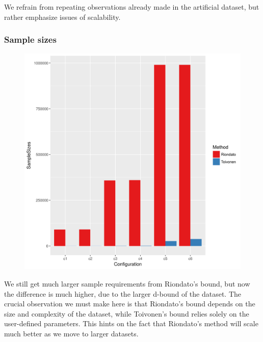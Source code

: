 \documentclass[11pt]{sigplanconf}
\begin{document}
We refrain from repeating observations already made in the artificial dataset, but rather emphasize issues of scalability.

\subsubsection{Sample sizes}
\begin{figure}[h!]
\centering
\includegraphics[width=.7\columnwidth]{kosarak.dat/sampleSizes.png}
\end{figure}
We still get much larger sample requirements from Riondato's bound, but now the difference is much higher, due to the larger d-bound of the dataset. The crucial observation we must make here is that Riondato's bound depends on the size and complexity of the dataset, while Toivonen's bound relies solely on the user-defined parameters. This hints on the fact that Riondato's method will scale much better as we move to larger datasets.
\end{document}
